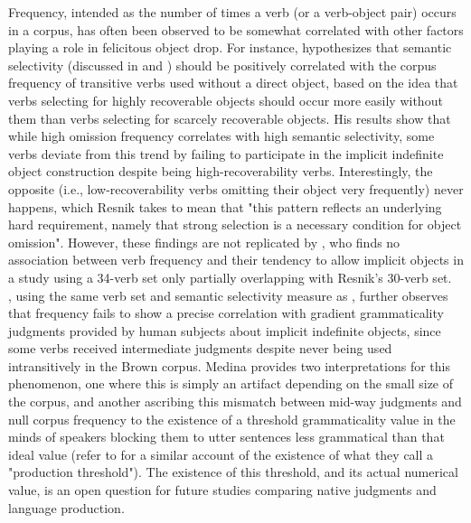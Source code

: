 Frequency, intended as the number of times a verb (or a verb-object pair) occurs in a corpus, has often been observed to be somewhat correlated with other factors playing a role in felicitous object drop. For instance, \textcite[149-151]{Resnik1996} hypothesizes that semantic selectivity (discussed in  and ) should be positively correlated with the corpus frequency of transitive verbs used without a direct object, based on the idea that verbs selecting for highly recoverable objects should occur more easily without them than verbs selecting for scarcely recoverable objects. His results show that while high omission frequency correlates with high semantic selectivity, some verbs deviate from this trend by failing to participate in the implicit indefinite object construction despite being high-recoverability verbs. Interestingly, the opposite (i.e., low-recoverability verbs omitting their object very frequently) never happens, which Resnik takes to mean that "this pattern reflects an underlying hard requirement, namely that strong selection is a necessary condition for object omission". However, these findings are not replicated by \textcite[441]{ruppenhofer2004interaction}, who finds no association between verb frequency and their tendency to allow implicit objects in a study using a 34-verb set only partially overlapping with Resnik's 30-verb set.\\
\textcite[165]{Medina2007}, using the same verb set and semantic selectivity measure as \textcite{Resnik1996}, further observes that frequency fails to show a precise correlation with gradient grammaticality judgments provided by human subjects about implicit indefinite objects, since some verbs received intermediate judgments despite never being used intransitively in the Brown corpus. Medina provides two interpretations for this phenomenon, one where this is simply an artifact depending on the small size of the corpus, and another ascribing this mismatch between mid-way judgments and null corpus frequency to the existence of a threshold grammaticality value in the minds of speakers blocking them to utter sentences less grammatical than that ideal value (refer to \textcite{KempenHarbusch2005} for a similar account of the existence of what they call a "production threshold"). The existence of this threshold, and its actual numerical value, is an open question for future studies comparing native judgments and language production.\\
